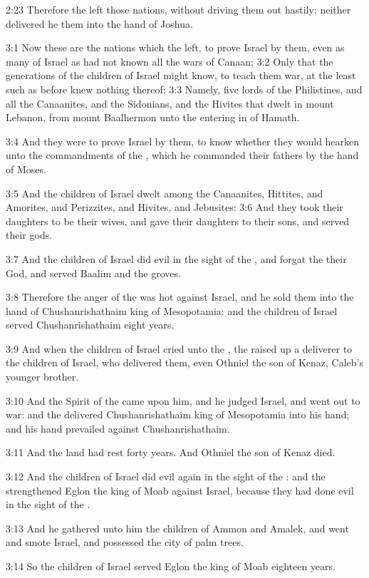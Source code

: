 2:23 Therefore the \LORD left those nations, without driving them out
hastily; neither delivered he them into the hand of Joshua.

3:1 Now these are the nations which the \LORD left, to prove Israel by
them, even as many of Israel as had not known all the wars of Canaan;
3:2 Only that the generations of the children of Israel might know, to
teach them war, at the least such as before knew nothing thereof; 3:3
Namely, five lords of the Philistines, and all the Canaanites, and the
Sidonians, and the Hivites that dwelt in mount Lebanon, from mount
Baalhermon unto the entering in of Hamath.

3:4 And they were to prove Israel by them, to know whether they would
hearken unto the commandments of the \LORD, which he commanded their
fathers by the hand of Moses.

3:5 And the children of Israel dwelt among the Canaanites, Hittites,
and Amorites, and Perizzites, and Hivites, and Jebusites: 3:6 And they
took their daughters to be their wives, and gave their daughters to
their sons, and served their gods.

3:7 And the children of Israel did evil in the sight of the \LORD, and
forgat the \LORD their God, and served Baalim and the groves.

3:8 Therefore the anger of the \LORD was hot against Israel, and he
sold them into the hand of Chushanrishathaim king of Mesopotamia: and
the children of Israel served Chushanrishathaim eight years.

3:9 And when the children of Israel cried unto the \LORD, the \LORD
raised up a deliverer to the children of Israel, who delivered them,
even Othniel the son of Kenaz, Caleb's younger brother.

3:10 And the Spirit of the \LORD came upon him, and he judged Israel,
and went out to war: and the \LORD delivered Chushanrishathaim king of
Mesopotamia into his hand; and his hand prevailed against
Chushanrishathaim.

3:11 And the land had rest forty years. And Othniel the son of Kenaz
died.

3:12 And the children of Israel did evil again in the sight of the
\LORD: and the \LORD strengthened Eglon the king of Moab against Israel,
because they had done evil in the sight of the \LORD.

3:13 And he gathered unto him the children of Ammon and Amalek, and
went and smote Israel, and possessed the city of palm trees.

3:14 So the children of Israel served Eglon the king of Moab eighteen
years.

